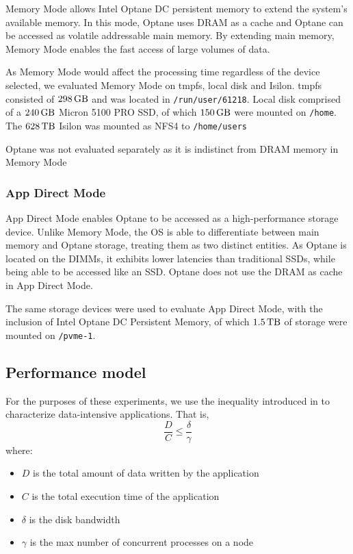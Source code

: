 \documentclass[conference]{IEEEtran}
\begin{document}
Memory Mode allows Intel Optane DC persistent memory to extend the system's available
memory. In this mode, Optane uses DRAM as a cache and Optane can be accessed as
volatile addressable main memory. By extending main memory, Memory Mode enables the
fast access of large volumes of data.

As Memory Mode would affect the processing time regardless of the device
selected, we evaluated Memory Mode on tmpfs, local disk and Isilon. tmpfs
consisted of $\SI{298}{\giga\byte}$ and was located in \texttt{/run/user/61218}.
Local disk comprised of a $\SI{240}{\giga\byte}$ Micron 5100 PRO SSD, of which
$\SI{150}{\giga\byte}$ were mounted on \texttt{/home}. The $\SI{628}{\tera\byte}$
Isilon was mounted as NFS4 to \texttt{/home/users}

Optane was not evaluated separately as it is indistinct from DRAM memory in
Memory Mode
\subsubsection{App Direct Mode}

App Direct Mode enables Optane to be accessed as a high-performance storage device.
Unlike Memory Mode, the OS is able to differentiate between main memory and Optane
storage, treating them as two distinct entities. As Optane is located on
the DIMMs, it exhibits lower latencies than traditional SSDs, while being able
to be accessed like an SSD. Optane does not use the DRAM as cache in App Direct Mode.

The same storage devices were used to evaluate App Direct Mode, with the inclusion
of Intel Optane DC Persistent Memory, of which $\SI{1.5}{\tera\byte}$ of storage
were mounted on \texttt{/pvme-1}.


\subsection{Performance model}

For the purposes of these experiments, we use the inequality introduced in
\cite{paperinmem} to characterize data-intensive applications. That is,
\begin{equation}                                                                 
\frac{D}{C} \leq \frac{\delta}{\gamma} \label{eq:page-cache-inequality}                                                                                                                                  
\end{equation} 
where:
\begin{itemize}
    \item $D$ is the total amount of data written by the application
    \item $C$ is the total execution time of the application
    \item $\delta$ is the disk bandwidth
    \item $\gamma$ is the max number of concurrent processes on a node
\end{itemize}
\end{document}
